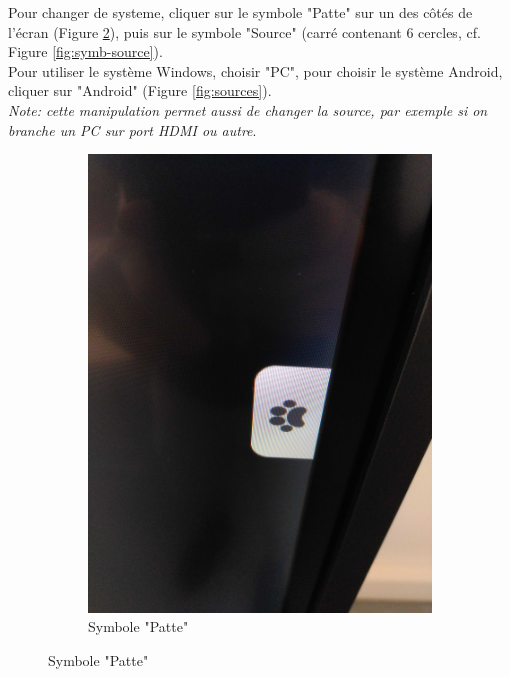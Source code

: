 \documentclass[10pt]{article}
\begin{document}
Pour changer de systeme, cliquer sur le symbole "Patte" sur un des côtés de l'écran (Figure \ref{fig:symb-patte}), puis sur le symbole "Source" (carré contenant 6 cercles, cf. Figure \ref{fig:symb-source}).\\

Pour utiliser le système Windows, choisir "PC", pour choisir le système Android, cliquer sur "Android" (Figure \ref{fig:sources}).\\

\emph{Note: cette manipulation permet aussi de changer la source, par exemple si on branche un PC sur port HDMI ou autre}.\\

\begin{figure}[h!]
	\centering
  	\begin{subfigure}[b]{0.4\textwidth}
		\includegraphics[width=\textwidth]{IMG_20220628_165539.jpg}
		\caption{Symbole "Patte"}
		\label{fig:symb-patte}
	\end{subfigure}

\end{figure}
\end{document}
